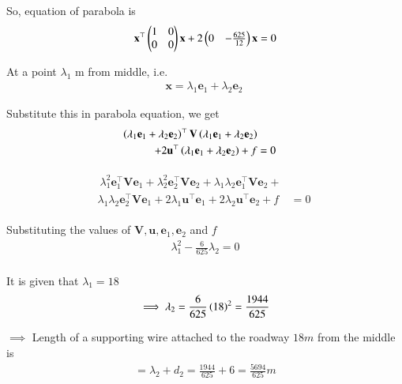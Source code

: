 \documentclass[journal,12pt,twocolumn]{IEEEtran}
\renewcommand{\vec}[1]{\boldsymbol{\mathbf{#1}}}
\begin{document}
So, equation of parabola is
\begin{align}
    \label{eq:parab1}  \vec{x}^{\top}\myvec{1&0\\0&0}\vec{x} + 2\myvec{0&-\frac{625}{12}}\vec{x} = 0 
\end{align}

At a point $\lambda_1$ m from middle, i.e.
\begin{align}
    \vec{x} = \lambda_1\vec{e}_1 + \lambda_2\vec{e}_2\
\end{align}

Substitute this in parabola equation, we get
\begin{align}
    \begin{split}
        \ \brak{\lambda_1\vec{e}_1 + \lambda_2\vec{e}_2}^{\top}\vec{V}\brak{\lambda_1\vec{e}_1 + \lambda_2\vec{e}_2} \\ + 2\vec{u}^{\top}\brak{\lambda_1\vec{e}_1 + \lambda_2\vec{e}_2} + f &= 0 \
    \end{split}
\end{align}

\begin{align}
    \begin{split}
        \ \lambda_1^2\vec{e}_1^{\top}\vec{V}\vec{e}_1 + \lambda_2^2\vec{e}_2^{\top}\vec{V}\vec{e}_2 + \lambda_1\lambda_2\vec{e}_1^{\top}\vec{V}\vec{e}_2 + \\\lambda_1\lambda_2\vec{e}_2^{\top}\vec{V}\vec{e}_1 + 2\lambda_1\vec{u}^{\top}\vec{e}_1 + 2\lambda_2\vec{u}^{\top}\vec{e}_2 + f &= 0 \
    \end{split}
\end{align}

Substituting the values of $\vec{V}, \vec{u}, \vec{e}_1, \vec{e}_2$ and $f$
\begin{align}
    \lambda_1^2 - \frac{6}{625}\lambda_2 = 0\\
\end{align}

It is given that $\lambda_1 = 18$
\begin{align}
    \implies \lambda_2 = \frac{6}{625}\left(18\right)^2 = \frac{1944}{625}
\end{align}

$\implies$ Length of a supporting wire attached to the roadway $18 m$ from the middle is 
\begin{align}
    = \lambda_2 + d_2 =  \frac{1944}{625} + 6 = \frac{5694}{625} m   
\end{align}
\end{document}
